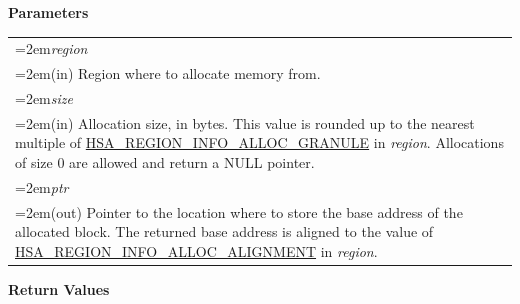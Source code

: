 \documentclass[final,oneside]{book}
\newcommand{\hsaarg}[1]{\textit{#1}}
\begin{document}
\noindent\textbf{Parameters}\\[-6mm]
\noindent\begin{longtable}{@{}>{\hangindent=2em}p{\textwidth}}
\hsaarg{region}\\\hspace{2em}(in) Region where to allocate memory from.\\[2mm]
\hsaarg{size}\\\hspace{2em}(in) Allocation size, in bytes. This value is rounded up to the nearest multiple of \hyperlink{group__memory_1ggad35755078ff15f645c6c25e7f7ef2707ab602c01f90962314de88fb887b6f13b3}{HSA_\-REGION_\-INFO_\-ALLOC_\-GRANULE} in \textit{region}. Allocations of size 0 are allowed and return a NULL pointer.\\[2mm]
\hsaarg{ptr}\\\hspace{2em}(out) Pointer to the location where to store the base address of the allocated block. The returned base address is aligned to the value of \hyperlink{group__memory_1ggad35755078ff15f645c6c25e7f7ef2707af3103bc1328080b236a7847f1bf4998e}{HSA_\-REGION_\-INFO_\-ALLOC_\-ALIGNMENT} in \textit{region}.
\end{longtable}
\vspace{-5mm}\noindent\textbf{Return Values}\\[-6mm]
\end{document}

